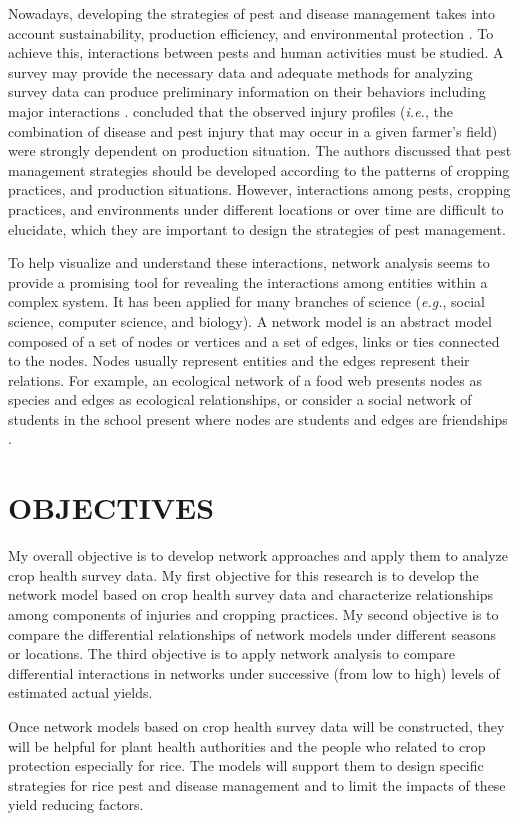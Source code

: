 Nowadays, developing the strategies of pest and disease management takes into account sustainability, production efficiency, and environmental protection \citep{Mew:2004kh}. To achieve this, interactions between pests and human activities must be studied. A survey may provide the necessary data and adequate methods for analyzing survey data can produce preliminary information on their behaviors including major interactions \citep{savary1995use}. \citet{Savary:2000vr} concluded that the observed injury profiles (\textit{i.e.}, the combination of disease and pest injury that may occur in a given farmer's field) were strongly dependent on production situation.  The authors discussed that pest management strategies should be developed according to the patterns of cropping practices, and production situations. However, interactions among pests, cropping practices, and environments under different locations or over time are difficult to elucidate, which they are important to design the strategies of pest management.

To help visualize and understand these interactions, network analysis seems to provide a promising tool for revealing the interactions among entities within a complex system. It has been applied for many branches of science (\textit{e.g.}, social science, computer science, and biology). A network model is an abstract model composed of a set of nodes or vertices and a set of edges, links or ties connected to the nodes. Nodes usually represent entities and the edges represent their relations. For example, an ecological network of a food web presents nodes as species \citep{krause2003compartments} and edges as ecological relationships, or consider a social network of students in the school present where nodes are students and edges are friendships \citep{moody2001race}.

\section*{OBJECTIVES}

My overall objective is to develop network approaches and apply them to analyze crop health survey data. My first objective for this research is to develop the network model based on crop health survey data and characterize relationships among components of injuries and cropping practices. My second objective is to compare the differential relationships of network models under different seasons or locations. The third objective is to apply network analysis to compare differential interactions in networks under successive (from low to high) levels of estimated actual yields.

Once network models based on crop health survey data will be constructed, they will be helpful for plant health authorities and the people who related to crop protection especially for rice. The models will support them to design specific strategies for rice pest and disease management and to limit the impacts of these yield reducing factors.

